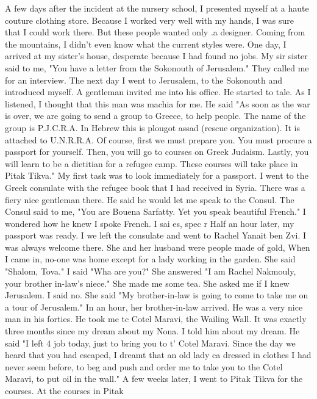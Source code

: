 {{A few days after the incident at the nursery school, I presented myself at a haute 
couture clothing store. Because I worked very well with my hands, I was sure that I 
could work there. But these people wanted only .a designer. Coming from the mountains, 
I didn't even know what the current styles were. 
One day, I arrived at my sister's house, desperate because I had found no jobs. My sir 
sister said to me, "You have a letter from the Sokonouth of Jerusalem." They called me 
for an interview. The next day I went to Jerusalem, to the Sokonouth and introduced 
myself. A gentleman invited me into his office. He started to tale. As I listened, I 
thought that this man was machia for me. He said "As soon as the war is over, we are 
going to send a group to Greece, to help people. The name of the group is P.J.C.R.A. 
In Hebrew this is plougot assad (rescue organization). It is attached to U.N.R.R.A. 
Of course, first we must prepare you. You must procure a passport for yourself. Then, 
you will go to courses on Greek Judaism. Lastly, you will learn to be a dietitian for 
a refugee camp. These courses will take place in Pitak Tikva." 
My first task was to look immediately for a passport. I went to the Greek consulate 
with the refugee book that I had received in Syria. There was a fiery nice gentleman there. 
He said he would let me speak to the Consul. 
The Consul said to me, "You are Bouena Sarfatty. Yet you speak beautiful French." 
I wondered how he knew I spoke French. I sai es, spec r 
Half an hour later, my passport was ready. I we left the consulate and went to Rachel 
Yanait ben Zvi. I was always welcome there. She and her husband were people made of 
gold, 
When I came in, no-one was home except for a lady working in the garden. She said 
"Shalom, Tova." I said "Wha are you?" She answered "I am Rachel Nakmouly, your brother 
in-law's niece." She made me some tea. She asked me if I knew Jerusalem. I said no. 
She said "My brother-in-law is going to come to take me on a tour of Jerusalem." In an 
hour, her brother-in-law arrived. He was a very nice man in his forties. He took me tc 
Cotel Maravi, the Wailing Wall. It was exactly three months since my dream about my 
Nona. I told him about my dream. He said "I left 4 job today, just to bring you to t' 
Cotel Maravi. Since the day we heard that you had escaped, I dreamt that an old lady ca 
dressed in clothes I had never seem before, to beg and push and order me to take you to 
the Cotel Maravi, to put oil in the wall." 
A few weeks later, I went to Pitak Tikva for the courses. At the courses in Pitak 
}}
